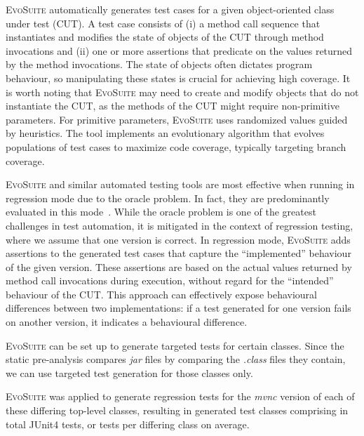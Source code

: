 \documentclass[conference]{IEEEtran}
\makeatletter
\newcommand{\evosuite}{\textsc{EvoSuite}\@\xspace}
\newcommand{\valerio}[1]{\textbf{\textcolor{blue}{[ \ding{46}Valerio: #1]}}}
\newcommand{\inputgen}[1]{\unskip}
\makeatother
\begin{document}
\evosuite automatically generates test cases for a given object-oriented class under test (CUT). A test case consists of (i) a method call sequence that instantiates and modifies the state of objects of the CUT through method invocations and (ii) one or more assertions that predicate on the values returned by the method invocations. The state of objects often dictates program behaviour, so manipulating these states is crucial for achieving high coverage. It is worth noting that \evosuite may need to create and modify objects that do not instantiate the CUT, as the methods of the CUT might require non-primitive parameters. For primitive parameters, \evosuite uses randomized values guided by heuristics. The tool implements an evolutionary algorithm that evolves populations of test cases to maximize code coverage, typically targeting branch coverage.

\evosuite and similar automated testing tools are most effective when running in regression mode due to the oracle problem. In fact, they are predominantly evaluated in this mode~\cite{jahangirova2023sbft,shamshiri2015automatically}. While the oracle problem is one of the greatest challenges in test automation, it is mitigated in the context of regression testing, where we assume that one version is correct. In regression mode, \evosuite adds assertions to the generated test cases that capture the ``implemented'' behaviour of the given version. These assertions are based on the actual values returned by method call invocations during execution, without regard for the ``intended'' behaviour of the CUT. This approach can effectively expose behavioural differences between two implementations: if a test generated for one version fails on another version, it indicates a behavioural difference.

\evosuite can be set up to generate targeted tests for certain classes. Since the static pre-analysis compares \textit{jar} files by comparing the \textit{.class} files they contain, we can use targeted test generation for those classes only.   

\evosuite was applied to generate regression tests for the \textit{mvnc} version of each of these \inputgen{num-top-level-class-pairs-after-invokevirtual-invokeinterface} differing top-level classes, resulting in \inputgen{num-classes-with-generated-tests} generated test classes comprising in total \inputgen{num-generated-tests} JUnit4 tests, or \inputgen{avg-tests-per-class} tests per differing class on average.
\end{document}
